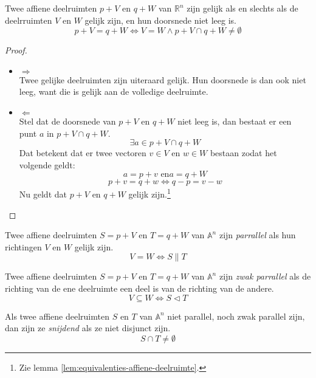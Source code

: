 \documentclass[main.tex]{subfiles}
\begin{document}
\begin{st}
  \label{st:affiene-deelruimten-niet-lege-doorsnede-gelijk}
  Twee affiene deelruimten $p + V$ en $q + W$ van $\mathbb{R}^{n}$ zijn gelijk als en slechts als de deelrruimten $V$ en $W$ gelijk zijn, en hun doorsnede niet leeg is.
  \[ p+V = q+W \Leftrightarrow V = W \wedge p+V \cap q+W \neq \emptyset \]
  
  \begin{proof}
    \begin{itemize}
    \item $\Rightarrow$\\
      Twee gelijke deelruimten zijn uiteraard gelijk. Hun doorsnede is dan ook niet leeg, want die is gelijk aan de volledige deelruimte.
    \item $\Leftarrow$\\
      Stel dat de doorsnede van $p + V$ en $q + W$ niet leeg is, dan bestaat er een punt $a$ in $p + V \cap q + W$.
      \[ \exists a \in p + V \cap q + W \]
      Dat betekent dat er twee vectoren $v \in V$ en $w \in W$ bestaan zodat het volgende geldt:
      \[ a = p + v \text{ en} a = q + W \]
      \[ p+v = q+w \Leftrightarrow q-p = v-w\]
      Nu geldt dat $p + V$ en $q + W$ gelijk zijn.\footnote{Zie lemma \ref{lem:equivalenties-affiene-deelruimte}.}
    \end{itemize}
  \end{proof}
\end{st}

\begin{de}
\label{de:parallel}
  Twee affiene deelruimten $S = p + V$ en $T = q + W$ van $\mathbb{A}^{n}$ zijn \emph{parrallel} als hun richtingen $V$ en $W$ gelijk zijn.
  \[ V = W \Leftrightarrow S \parallel T \]
\end{de}

\begin{de}
\label{de:zwak-parallel}
  Twee affiene deelruimten $S = p + V$ en $T = q + W$ van $\mathbb{A}^{n}$ zijn \emph{zwak parrallel} als de richting van de ene deelruimte een deel is van de richting van de andere.
  \[ V \subseteq W \Leftrightarrow S \vartriangleleft T \]
\end{de}

\begin{de}
  Als twee affiene deelruimten $S$ en $T$ van $\mathbb{A}^{n}$ niet parallel, noch zwak parallel zijn, dan zijn ze \emph{snijdend} als ze niet disjunct zijn.
  \[ S \cap T \neq \emptyset \]
\end{de}
\end{document}
